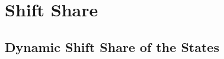 \chapter{Shift Share}
\label{appendix:shiftshare}
\section{Dynamic Shift Share of the States}

\begin{landscape}




\end{landscape}